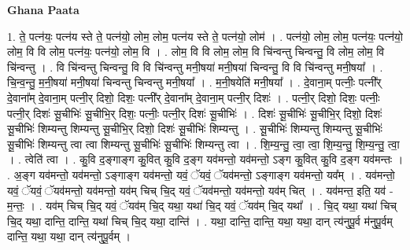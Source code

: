 \documentclass[17pt]{extarticle}
\begin{document}
\textbf{Ghana Paata } \newline

1. ते॒ पत्न॑यः॒ पत्न॑य स्ते ते॒ पत्न॑यो॒ लोम॒ लोम॒ पत्न॑य स्ते ते॒ पत्न॑यो॒ लोम॑ । . पत्न॑यो॒ लोम॒ लोम॒ पत्न॑यः॒ पत्न॑यो॒ लोम॒ वि वि लोम॒ पत्न॑यः॒ पत्न॑यो॒ लोम॒ वि । . लोम॒ वि वि लोम॒ लोम॒ वि चि॑न्वन्तु चिन्वन्तु॒ वि लोम॒ लोम॒ वि चि॑न्वन्तु । . वि चि॑न्वन्तु चिन्वन्तु॒ वि वि चि॑न्वन्तु मनी॒षया॑ मनी॒षया॑ चिन्वन्तु॒ वि वि चि॑न्वन्तु मनी॒षया᳚ । . चि॒न्व॒न्तु॒ म॒नी॒षया॑ मनी॒षया॑ चिन्वन्तु चिन्वन्तु मनी॒षया᳚ । . म॒नी॒षयेति॑ मनी॒षया᳚ । . दे॒वाना॒म् पत्नीः॒ पत्नी᳚र् दे॒वाना᳚म् दे॒वाना॒म् पत्नी॒र् दिशो॒ दिशः॒ पत्नी᳚र् दे॒वाना᳚म् दे॒वाना॒म् पत्नी॒र् दिशः॑ । . पत्नी॒र् दिशो॒ दिशः॒ पत्नीः॒ पत्नी॒र् दिशः॑ सू॒चीभिः॑ सू॒चीभि॒र् दिशः॒ पत्नीः॒ पत्नी॒र् दिशः॑ सू॒चीभिः॑ । . दिशः॑ सू॒चीभिः॑ सू॒चीभि॒र् दिशो॒ दिशः॑ सू॒चीभिः॑ शिम्यन्तु शिम्यन्तु सू॒चीभि॒र् दिशो॒ दिशः॑ सू॒चीभिः॑ शिम्यन्तु । . सू॒चीभिः॑ शिम्यन्तु शिम्यन्तु सू॒चीभिः॑ सू॒चीभिः॑ शिम्यन्तु त्वा त्वा शिम्यन्तु सू॒चीभिः॑ सू॒चीभिः॑ शिम्यन्तु त्वा । . शि॒म्य॒न्तु॒ त्वा॒ त्वा॒ शि॒म्य॒न्तु॒ शि॒म्य॒न्तु॒ त्वा॒ । . त्वेति॑ त्वा । . कु॒वि द॒ङ्गाङ्ग कु॒वित् कु॒वि द॒ङ्ग यव॑मन्तो॒ यव॑मन्तो॒ ऽङ्ग कु॒वित् कु॒वि द॒ङ्ग यव॑मन्तः । . अ॒ङ्ग यव॑मन्तो॒ यव॑मन्तो॒ ऽङ्गाङ्ग यव॑मन्तो॒ यवं॒ ॅयवं॒ ॅयव॑मन्तो॒ ऽङ्गाङ्ग यव॑मन्तो॒ यव᳚म् । . यव॑मन्तो॒ यवं॒ ॅयवं॒ ॅयव॑मन्तो॒ यव॑मन्तो॒ यव॑म् चिच् चि॒द् यवं॒ ॅयव॑मन्तो॒ यव॑मन्तो॒ यव॑म् चित् । . यव॑मन्त॒ इति॒ यव॑ - म॒न्तः॒ । . यव॑म् चिच् चि॒द् यवं॒ ॅयव॑म् चि॒द् यथा॒ यथा॑ चि॒द् यवं॒ ॅयव॑म् चि॒द् यथा᳚ । . चि॒द् यथा॒ यथा॑ चिच् चि॒द् यथा॒ दान्ति॒ दान्ति॒ यथा॑ चिच् चि॒द् यथा॒ दान्ति॑ । . यथा॒ दान्ति॒ दान्ति॒ यथा॒ यथा॒ दान् त्य॑नुपू॒र्व म॑नुपू॒र्वम् दान्ति॒ यथा॒ यथा॒ दान् त्य॑नुपू॒र्वम् । \newline
\end{document}
